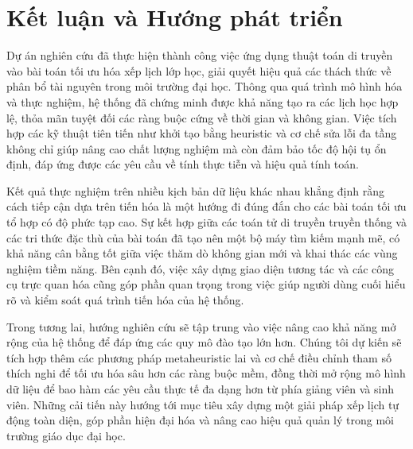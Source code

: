 \section{Kết luận và Hướng phát triển}

Dự án nghiên cứu đã thực hiện thành công việc ứng dụng thuật toán di truyền vào bài toán tối ưu hóa xếp lịch lớp học, giải quyết hiệu quả các thách thức về phân bổ tài nguyên trong môi trường đại học. Thông qua quá trình mô hình hóa và thực nghiệm, hệ thống đã chứng minh được khả năng tạo ra các lịch học hợp lệ, thỏa mãn tuyệt đối các ràng buộc cứng về thời gian và không gian. Việc tích hợp các kỹ thuật tiên tiến như khởi tạo bằng heuristic và cơ chế sửa lỗi đa tầng không chỉ giúp nâng cao chất lượng nghiệm mà còn đảm bảo tốc độ hội tụ ổn định, đáp ứng được các yêu cầu về tính thực tiễn và hiệu quả tính toán.

Kết quả thực nghiệm trên nhiều kịch bản dữ liệu khác nhau khẳng định rằng cách tiếp cận dựa trên tiến hóa là một hướng đi đúng đắn cho các bài toán tối ưu tổ hợp có độ phức tạp cao. Sự kết hợp giữa các toán tử di truyền truyền thống và các tri thức đặc thù của bài toán đã tạo nên một bộ máy tìm kiếm mạnh mẽ, có khả năng cân bằng tốt giữa việc thăm dò không gian mới và khai thác các vùng nghiệm tiềm năng. Bên cạnh đó, việc xây dựng giao diện tương tác và các công cụ trực quan hóa cũng góp phần quan trọng trong việc giúp người dùng cuối hiểu rõ và kiểm soát quá trình tiến hóa của hệ thống.

Trong tương lai, hướng nghiên cứu sẽ tập trung vào việc nâng cao khả năng mở rộng của hệ thống để đáp ứng các quy mô đào tạo lớn hơn. Chúng tôi dự kiến sẽ tích hợp thêm các phương pháp metaheuristic lai và cơ chế điều chỉnh tham số thích nghi để tối ưu hóa sâu hơn các ràng buộc mềm, đồng thời mở rộng mô hình dữ liệu để bao hàm các yêu cầu thực tế đa dạng hơn từ phía giảng viên và sinh viên. Những cải tiến này hướng tới mục tiêu xây dựng một giải pháp xếp lịch tự động toàn diện, góp phần hiện đại hóa và nâng cao hiệu quả quản lý trong môi trường giáo dục đại học.
